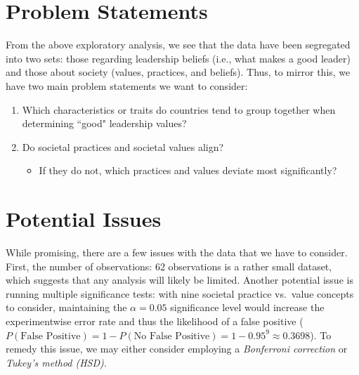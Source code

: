 \documentclass[
]{article}
\begin{document}
\hypertarget{problem-statements}{%
\section{Problem Statements}\label{problem-statements}}

From the above exploratory analysis, we see that the data have been
segregated into two sets: those regarding leadership beliefs (i.e., what
makes a good leader) and those about society (values, practices, and
beliefs). Thus, to mirror this, we have two main problem statements we
want to consider:

\begin{enumerate}
    \item Which characteristics or traits do countries tend to group together when determining ``good" leadership values?
    \item Do societal practices and societal values align?
    \begin{itemize}
        \item If they do not, which practices and values deviate most significantly?
    \end{itemize}
\end{enumerate}

\hypertarget{potential-issues}{%
\section{Potential Issues}\label{potential-issues}}

While promising, there are a few issues with the data that we have to
consider. First, the number of observations: 62 observations is a rather
small dataset, which suggests that any analysis will likely be limited.
Another potential issue is running multiple significance tests: with
nine societal practice vs.~value concepts to consider, maintaining the
\(\alpha = 0.05\) significance level would increase the experimentwise
error rate and thus the likelihood of a false positive
(\(P(\text{False Positive}) = 1 - P(\text{No False Positive}) = 1 - 0.95^{9} \approx 0.3698\)).
To remedy this issue, we may either consider employing a
\emph{Bonferroni correction} or \emph{Tukey's method (HSD).}
\end{document}
